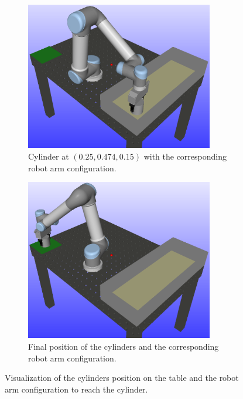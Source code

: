 \documentclass[../main.tex]{subfiles}
\begin{document}
\begin{figure}[H]
\begin{subfigure}[t]{0.24\textwidth}
        \label{subfig:rrt_cylinder2}
    \end{subfigure}
    \begin{subfigure}[t]{0.24\textwidth}
        \centering
        \captionsetup{width=.9\textwidth}
        \includegraphics[width=0.9\textwidth]{figures/robot_motion_planning/rrt_connect/cylinder3.png}
        \caption{Cylinder at $(0.25, 0.474, 0.15)$ with the corresponding robot arm configuration.}
        \label{subfig:rrt_cylinder3}
    \end{subfigure}
    \begin{subfigure}[t]{0.24\textwidth}
        \centering
        \captionsetup{width=.9\textwidth}
        \includegraphics[width=0.9\textwidth]{figures/robot_motion_planning/rrt_connect/cylinder4.png}
        \caption{Final position of the cylinders and the corresponding robot arm configuration.}
        \label{subfig:rrt_cylinder4}
    \end{subfigure}
    \caption{Visualization of the cylinders position on the table and the robot arm configuration to reach the cylinder.}
    \label{fig:rrt_scene}
\end{figure}
\end{document}
